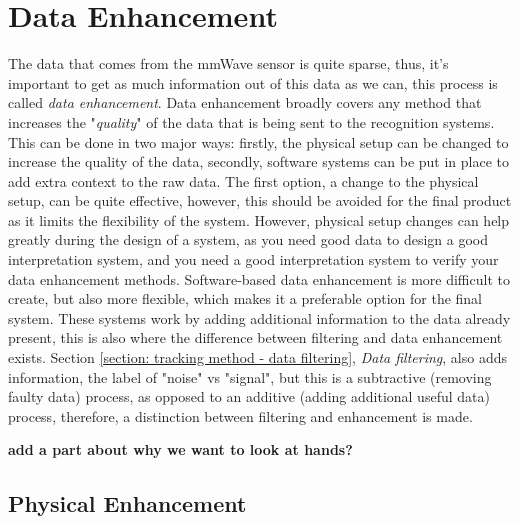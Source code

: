 \section{Data Enhancement}
\label{section: tracking method - data enhancement}


The data that comes from the mmWave sensor is quite sparse, thus, it's important to get as much information out of this data as we can, this process is called \textit{data enhancement}.
Data enhancement broadly covers any method that increases the "\textit{quality}" of the data that is being sent to the recognition systems.
This can be done in two major ways: firstly, the physical setup can be changed to increase the quality of the data, secondly, software systems can be put in place to add extra context to the raw data.
The first option, a change to the physical setup, can be quite effective, however, this should be avoided for the final product as it limits the flexibility of the system.
However, physical setup changes can help greatly during the design of a system, as you need good data to design a good interpretation system, and you need a good interpretation system to verify your data enhancement methods.
Software-based data enhancement is more difficult to create, but also more flexible, which makes it a preferable option for the final system.
These systems work by adding additional information to the data already present, this is also where the difference between filtering and data enhancement exists.
Section \ref{section: tracking method - data filtering}, \textit{Data filtering}, also adds information, the label of "noise" vs "signal", but this is a subtractive (removing faulty data) process, as opposed to an additive (adding additional useful data) process, therefore, a distinction between filtering and enhancement is made.

\textbf{add a part about why we want to look at hands?}

\subsection{Physical Enhancement}
\label{sub-section: tracking method - data enhancement - physical enhancement}


